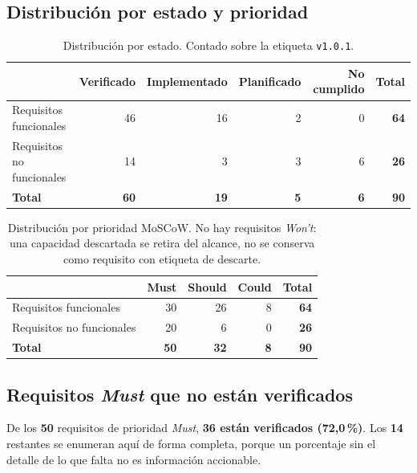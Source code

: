 \documentclass[11pt,a4paper]{article}
\begin{document}
\subsection{Distribución por estado y prioridad}

\begin{table}[H]\centering\small
\begin{tabular}{lrrrrr}
\toprule
& \textbf{Verificado} & \textbf{Implementado} & \textbf{Planificado} & \textbf{No cumplido} &
\textbf{Total} \\
\midrule
Requisitos funcionales     & 46 & 16 & 2 & 0 & \textbf{64} \\
Requisitos no funcionales  & 14 &  3 & 3 & 6 & \textbf{26} \\
\midrule
\textbf{Total}             & \textbf{60} & \textbf{19} & \textbf{5} & \textbf{6} &
\textbf{90} \\
\bottomrule
\end{tabular}
\caption{Distribución por estado. Contado sobre la etiqueta \texttt{v1.0.1}.}
\end{table}

\begin{table}[H]\centering\small
\begin{tabular}{lrrrr}
\toprule
& \textbf{Must} & \textbf{Should} & \textbf{Could} & \textbf{Total} \\
\midrule
Requisitos funcionales    & 30 & 26 & 8 & \textbf{64} \\
Requisitos no funcionales & 20 &  6 & 0 & \textbf{26} \\
\midrule
\textbf{Total}            & \textbf{50} & \textbf{32} & \textbf{8} & \textbf{90} \\
\bottomrule
\end{tabular}
\caption{Distribución por prioridad MoSCoW. No hay requisitos \emph{Won't}: una capacidad
descartada se retira del alcance, no se conserva como requisito con etiqueta de descarte.}
\end{table}

\subsection{Requisitos \emph{Must} que no están verificados}

De los \textbf{50} requisitos de prioridad \emph{Must}, \textbf{36 están verificados
(72,0\,\%)}. Los \textbf{14} restantes se enumeran aquí de forma completa, porque un porcentaje
sin el detalle de lo que falta no es información accionable.
\end{document}

